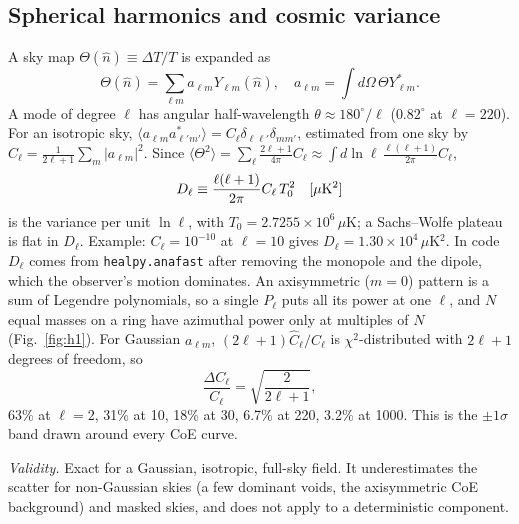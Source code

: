 \documentclass[10pt,twocolumn]{article}
\newcommand{\why}[1]{\par\noindent\textit{Validity.} #1\par}
\begin{document}
\subsection{Spherical harmonics and cosmic variance}
A sky map $\Theta(\hat n)\equiv\Delta T/T$ is expanded as
\begin{equation}
\Theta(\hat n)=\sum_{\ell m}a_{\ell m}Y_{\ell m}(\hat n),\quad a_{\ell m}=\!\int\!d\Omega\,\Theta Y^*_{\ell m}.
\end{equation}
A mode of degree $\ell$ has angular half-wavelength $\theta\approx180^\circ/\ell$ ($0.82^\circ$ at $\ell=220$). For an isotropic sky, $\langle a_{\ell m}a^*_{\ell'm'}\rangle=C_\ell\delta_{\ell\ell'}\delta_{mm'}$, estimated from one sky by $\hat C_\ell=\frac{1}{2\ell+1}\sum_m|a_{\ell m}|^2$. Since $\langle\Theta^2\rangle=\sum_\ell\frac{2\ell+1}{4\pi}C_\ell\approx\int d\ln\ell\,\frac{\ell(\ell+1)}{2\pi}C_\ell$,
\begin{equation}\label{eq:Dl}
D_\ell\equiv\frac{\ell(\ell+1)}{2\pi}C_\ell\,T_0^2\quad[\mu{\rm K}^2]
\end{equation}
is the variance per unit $\ln\ell$, with $T_0=2.7255\times10^6\,\mu$K; a Sachs--Wolfe plateau is flat in $D_\ell$. Example: $C_\ell=10^{-10}$ at $\ell=10$ gives $D_\ell=1.30\times10^4\,\mu$K$^2$. In code $D_\ell$ comes from \texttt{healpy.anafast} after removing the monopole and the dipole, which the observer's motion dominates. An axisymmetric ($m=0$) pattern is a sum of Legendre polynomials, so a single $P_\ell$ puts all its power at one $\ell$, and $N$ equal masses on a ring have azimuthal power only at multiples of $N$ (Fig.~\ref{fig:h1}). For Gaussian $a_{\ell m}$, $(2\ell+1)\hat C_\ell/C_\ell$ is $\chi^2$-distributed with $2\ell+1$ degrees of freedom, so
\begin{equation}\label{eq:cv}
\frac{\Delta C_\ell}{C_\ell}=\sqrt{\frac{2}{2\ell+1}} ,
\end{equation}
63\% at $\ell=2$, 31\% at 10, 18\% at 30, 6.7\% at 220, 3.2\% at 1000. This is the $\pm1\sigma$ band drawn around every CoE curve.
\why{Exact for a Gaussian, isotropic, full-sky field. It underestimates the scatter for non-Gaussian skies (a few dominant voids, the axisymmetric CoE background) and masked skies, and does not apply to a deterministic component.}
\end{document}
